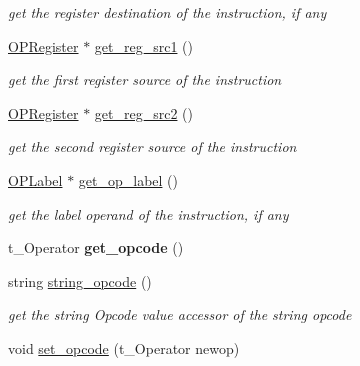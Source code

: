 \begin{DoxyCompactItemize}
\begin{DoxyCompactList}\small\item\em get the register destination of the instruction, if any \end{DoxyCompactList}\item 
\hypertarget{class_instruction_ac353a6ad2b3f3b1aee179d5910b5127b}{}\hyperlink{class_o_p_register}{O\+P\+Register} $\ast$ \hyperlink{class_instruction_ac353a6ad2b3f3b1aee179d5910b5127b}{get\+\_\+reg\+\_\+src1} ()\label{class_instruction_ac353a6ad2b3f3b1aee179d5910b5127b}

\begin{DoxyCompactList}\small\item\em get the first register source of the instruction \end{DoxyCompactList}\item 
\hypertarget{class_instruction_a0eb007b1b0a038610e71a58af3bb6438}{}\hyperlink{class_o_p_register}{O\+P\+Register} $\ast$ \hyperlink{class_instruction_a0eb007b1b0a038610e71a58af3bb6438}{get\+\_\+reg\+\_\+src2} ()\label{class_instruction_a0eb007b1b0a038610e71a58af3bb6438}

\begin{DoxyCompactList}\small\item\em get the second register source of the instruction \end{DoxyCompactList}\item 
\hypertarget{class_instruction_aa32973fb1e9e24659095e4795c153c8a}{}\hyperlink{class_o_p_label}{O\+P\+Label} $\ast$ \hyperlink{class_instruction_aa32973fb1e9e24659095e4795c153c8a}{get\+\_\+op\+\_\+label} ()\label{class_instruction_aa32973fb1e9e24659095e4795c153c8a}

\begin{DoxyCompactList}\small\item\em get the label operand of the instruction, if any \end{DoxyCompactList}\item 
\hypertarget{class_instruction_a1195d03eb4ff6024b20cd2cec1c8a1e0}{}t\+\_\+\+Operator {\bfseries get\+\_\+opcode} ()\label{class_instruction_a1195d03eb4ff6024b20cd2cec1c8a1e0}

\item 
\hypertarget{class_instruction_aeba180e03a3ac7f7ecba7635d454566f}{}string \hyperlink{class_instruction_aeba180e03a3ac7f7ecba7635d454566f}{string\+\_\+opcode} ()\label{class_instruction_aeba180e03a3ac7f7ecba7635d454566f}

\begin{DoxyCompactList}\small\item\em get the string Opcode value accessor of the string opcode \end{DoxyCompactList}\item 
\hypertarget{class_instruction_a49524f35c4ade25c663d798e3a5df2cb}{}void \hyperlink{class_instruction_a49524f35c4ade25c663d798e3a5df2cb}{set\+\_\+opcode} (t\+\_\+\+Operator newop)\label{class_instruction_a49524f35c4ade25c663d798e3a5df2cb}


\end{DoxyCompactItemize}
